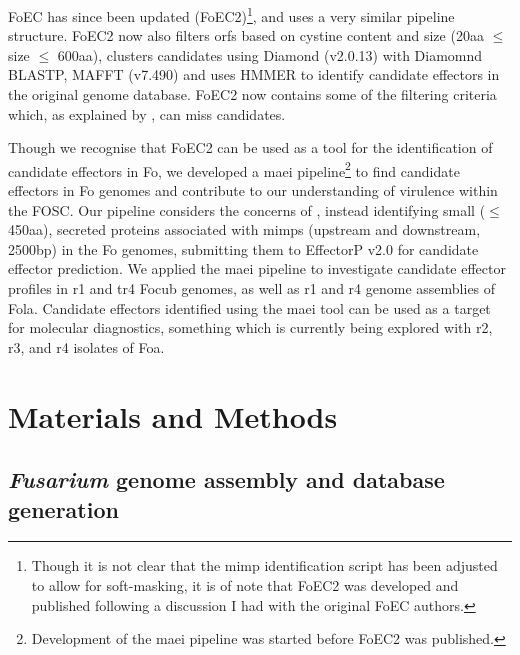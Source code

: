 FoEC has since been updated \parencite{FoEC2} (FoEC2)\footnote{Though it is not clear that the \ac{mimp} identification script has been adjusted to allow for soft-masking, it is of note that FoEC2 was developed and published following a discussion I had with the original FoEC authors.}, and uses a very similar pipeline structure. FoEC2 now also filters \acp{orf} based on cystine content and size (20aa $\leq$ size $\leq$ 600aa), clusters candidates using Diamond (v2.0.13) with Diamomnd BLASTP, MAFFT (v7.490) \parencite{Katoh2019} and uses HMMER \parencite{Eddy2011} to identify candidate effectors in the original genome database. FoEC2 now contains some of the filtering criteria which, as explained by \textcite{Sperschneider2015, LoPresti2015, Todd2022}, can miss candidates. 

Though we recognise that FoEC2 can be used as a tool for the identification of candidate effectors in \ac{Fo}, we developed a \ac{maei} pipeline\footnote{Development of the \ac{maei} pipeline was started before FoEC2 was published.} to find candidate effectors in \ac{Fo} genomes and contribute to our understanding of virulence within the \ac{FOSC}. Our pipeline considers the concerns of \textcite{LoPresti2015, Sperschneider2015, Todd2022}, instead identifying small ($\leq$450aa), secreted proteins associated with \acp{mimp} (upstream and downstream, 2500bp) in the \ac{Fo} genomes, submitting them to EffectorP v2.0 for candidate effector prediction. We applied the \ac{maei} pipeline to investigate candidate effector profiles in \ac{r1} and \ac{tr4} \ac{Focub} genomes, as well as \ac{r1} and \ac{r4} genome assemblies of \ac{Fola}. Candidate effectors identified using the \ac{maei} tool can be used as a target for molecular diagnostics, something which is currently being explored with \ac{r2}, \ac{r3}, and \ac{r4} isolates of \ac{Foa}. 

\newpage
\section{Materials and Methods}

\subsection{\textit{Fusarium} genome assembly and database generation}\label{chap3:fusariumdb}

